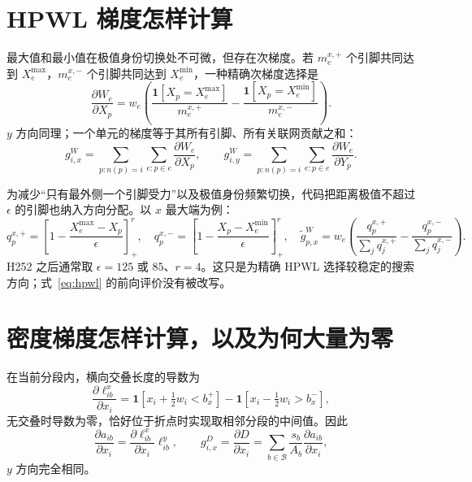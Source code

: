 \documentclass[UTF8,a4paper,11pt]{ctexrep}
\newcommand{\Bcal}{\mathcal{B}}
\begin{document}
\section{HPWL 梯度怎样计算}
最大值和最小值在极值身份切换处不可微，但存在次梯度。若 $m_e^{x,+}$ 个引脚共同达到 $X_e^{\max}$，$m_e^{x,-}$ 个引脚共同达到 $X_e^{\min}$，一种精确次梯度选择是
\begin{equation}
 \frac{\partial W_e}{\partial X_p}=w_e\left(
 \frac{\mathbf 1[X_p=X_e^{\max}]}{m_e^{x,+}}-
 \frac{\mathbf 1[X_p=X_e^{\min}]}{m_e^{x,-}}\right). \label{eq:hpwlsubgrad}
\end{equation}
$y$ 方向同理；一个单元的梯度等于其所有引脚、所有关联网贡献之和：
\begin{equation}
 g^W_{i,x}=\sum_{p:n(p)=i}\sum_{e:p\in e}\frac{\partial W_e}{\partial X_p},
 \qquad g^W_{i,y}=\sum_{p:n(p)=i}\sum_{e:p\in e}\frac{\partial W_e}{\partial Y_p}. \label{eq:nodehpwlgrad}
\end{equation}

为减少“只有最外侧一个引脚受力”以及极值身份频繁切换，代码把距离极值不超过 $\epsilon$ 的引脚也纳入方向分配。以 $x$ 最大端为例：
\begin{equation}
 q^{x,+}_{p}=\left[1-\frac{X_e^{\max}-X_p}{\epsilon}\right]_+^r,
 \quad q^{x,-}_{p}=\left[1-\frac{X_p-X_e^{\min}}{\epsilon}\right]_+^r,
 \quad
 \widetilde g^W_{p,x}=w_e\left(
 \frac{q^{x,+}_p}{\sum_jq^{x,+}_j}-\frac{q^{x,-}_p}{\sum_jq^{x,-}_j}\right). \label{eq:epsilonactive}
\end{equation}
H252 之后通常取 $\epsilon=125$ 或 $85$、$r=4$。这只是为精确 HPWL 选择较稳定的搜索方向；式~\eqref{eq:hpwl} 的前向评价没有被改写。

\section{密度梯度怎样计算，以及为何大量为零}
在当前分段内，横向交叠长度的导数为
\begin{equation}
 \frac{\partial\ell^x_{ib}}{\partial x_i}=
 \mathbf 1[x_i+\tfrac12w_i<b_x^+]-
 \mathbf 1[x_i-\tfrac12w_i>b_x^-], \label{eq:intervalgrad}
\end{equation}
无交叠时导数为零，恰好位于折点时实现取相邻分段的中间值。因此
\begin{equation}
 \frac{\partial a_{ib}}{\partial x_i}
 =\frac{\partial\ell^x_{ib}}{\partial x_i}\ell^y_{ib},\qquad
 g^D_{i,x}=\frac{\partial D}{\partial x_i}
 =\sum_{b\in\Bcal}\frac{s_b}{A_b}
 \frac{\partial a_{ib}}{\partial x_i}, \label{eq:densitygrad}
\end{equation}
$y$ 方向完全相同。
\end{document}
